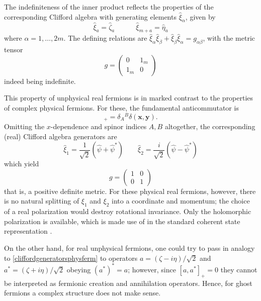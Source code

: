 \documentclass[a4paper,10pt]{article}
\begin{document}
The indefiniteness of the inner product reflects the properties of the corresponding 
Clifford algebra with generating elements $\hat{\xi}_{\alpha}$, given by 
\begin{equation}\label{metricunphysicalrealfermions}
\hat{\xi}_a=\hat{\zeta}_a\qquad\quad\hat{\xi}_{m+a}=\hat{\eta}_a
\end{equation}
where $\alpha=1,\ldots,2m$. The defining relations are 
$\hat{\xi}_{\alpha}\hat{\xi}_{\beta}+\hat{\xi}_{\beta}\hat{\xi}_{\alpha}=g_{\alpha\beta}$, 
with the metric tensor
\begin{equation}
g=\begin{pmatrix}0&1_m\\1_m&0\end{pmatrix}
\end{equation}
indeed being indefinite. 

This property of unphysical real fermions is in marked contrast to the properties of 
complex physical fermions. For these, the fundamental anticommutator is 
\begin{equation}
[\hat{\psi}^{\ast}_A(\mathbf{x}),\hat{\psi}^B(\mathbf{y})]_+=\delta_A{}^B
\delta(\mathbf{x},\mathbf{y}).
\end{equation}
Omitting the $x$-dependence and spinor indices $A,B$ altogether, the corresponding (real)  
Clifford algebra generators are
\begin{equation}\label{cliffordgeneratorsphysferm}
\hat{\xi}_1=\frac{1}{\sqrt{2}}(\hat{\psi}+\hat{\psi}^{\ast})\qquad
\hat{\xi}_2=\frac{i}{\sqrt{2}}(\hat{\psi}-\hat{\psi}^{\ast})
\end{equation}
which yield 
\begin{equation}\label{metricphysicalrealfermions}
g=\begin{pmatrix}1&0\\0&1\end{pmatrix}
\end{equation}
that is, a positive definite metric. For these physical real fermions, however, there is 
no natural splitting of $\xi_1$ and $\xi_2$ into a coordinate and momentum; the choice of 
a real polarization would destroy rotational invariance. Only the holomorphic 
polarization is available, which is made use of in the standard coherent state 
representation \cite{Fadd 76}.

On the other hand, for real unphysical fermions, one could try to pass in analogy to 
\eqref{cliffordgeneratorsphysferm} to operators $a=(\zeta-i\eta)/\sqrt{2}$ and 
$a^{\ast}=(\zeta+i\eta)/\sqrt{2}$ obeying $(a^{\ast})^{\ast}=a$; however, since 
$[a,a^{\ast}]_+=0$ they cannot be interpreted as fermionic creation and annihilation 
operators. Hence, for ghost fermions a complex structure does not make sense.
\end{document}
